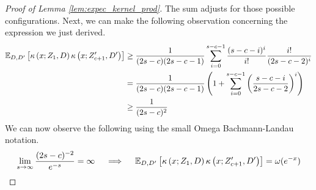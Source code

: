 \begin{proof}[Proof of Lemma \ref{lem:expec_kernel_prod}]
    The sum adjusts for those possible configurations.
    Next, we can make the following observation concerning the expression we just derived.
    \begin{equation}
        \begin{aligned}
            \mathbb{E}_{D, D^{\prime}}\left[\kappa\left(x; Z_{1}, D\right)\kappa\left(x; Z_{c+1}^{\prime}, D^{\prime}\right)\right]
            & \geq \frac{1}{(2s - c)(2s-c-1)}\sum_{i = 0}^{s - c - 1}\frac{(s - c - i)^{i}}{i!}\frac{i!}{(2s-c-2)^{i}} \\
            & = \frac{1}{(2s - c)(2s-c-1)}\left(1 + \sum_{i = 0}^{s - c - 1}\left(\frac{s - c - i}{2s-c-2}\right)^{i}\right)\\
            & \geq \frac{1}{(2s - c)^{2}}
        \end{aligned}
    \end{equation}
    We can now observe the following using the small Omega Bachmann-Landau notation.
    \begin{equation}
        \lim_{s \rightarrow \infty} \frac{(2s-c)^{-2}}{e^{-s}} = \infty
        \quad \implies \quad
        \mathbb{E}_{D, D^{\prime}}\left[\kappa\left(x; Z_{1}, D\right)\kappa\left(x; Z_{c+1}^{\prime}, D^{\prime}\right)\right]
        = \omega(e^{-x})
    \end{equation}
    

\end{proof}
